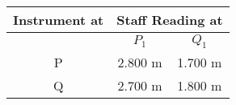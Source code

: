 \begin{center}
	\begin{tabular}{|c|c|c|}
		\hline
		\textbf{Instrument at} & \multicolumn{2}{c|}{\textbf{Staff Reading at}} \\ \hline
		& \(P_1\) & \(Q_1\) \\ \hline
		P & 2.800 m & 1.700 m \\ \hline
		Q & 2.700 m & 1.800 m \\ \hline
	\end{tabular}
\end{center}